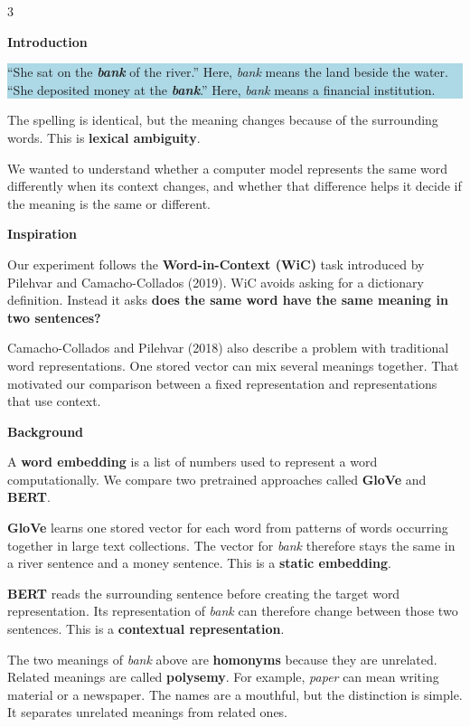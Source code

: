 \documentclass{article}
\newcommand{\sectiontitle}[1]{%
  \Needspace{4\baselineskip}%
  \par\vspace{5mm}%
  {\fontsize{30}{35}\selectfont\bfseries\textcolor{trierblue}{#1}\par}%
  \vspace{6mm}%
}
\newcommand{\keybox}[1]{%
  \colorbox{lightblue}{%
    \parbox{0.955\linewidth}{\vspace{2mm}\RaggedRight #1\vspace{2mm}}%
  }%
}
\begin{document}
\begin{multicols}{3}
\RaggedRight

\sectiontitle{Introduction}
\keybox{%
``She sat on the \textbf{\textit{bank}} of the river.'' Here, \textit{bank} means the land beside the water.\\[1.5mm]
``She deposited money at the \textbf{\textit{bank}}.'' Here, \textit{bank} means a financial institution.
}
\par\vspace{3mm}

The spelling is identical, but the meaning changes because of the surrounding words. This is \textbf{lexical ambiguity}.

We wanted to understand whether a computer model represents the same word differently when its context changes, and whether that difference helps it decide if the meaning is the same or different.

\sectiontitle{Inspiration}
Our experiment follows the \textbf{Word-in-Context (WiC)} task introduced by Pilehvar and Camacho-Collados (2019). WiC avoids asking for a dictionary definition. Instead it asks \textbf{does the same word have the same meaning in two sentences?}

Camacho-Collados and Pilehvar (2018) also describe a problem with traditional word representations. One stored vector can mix several meanings together. That motivated our comparison between a fixed representation and representations that use context.

\sectiontitle{Background}
A \textbf{word embedding} is a list of numbers used to represent a word computationally. We compare two pretrained approaches called \textbf{GloVe} and \textbf{BERT}.

\textbf{GloVe} learns one stored vector for each word from patterns of words occurring together in large text collections. The vector for \textit{bank} therefore stays the same in a river sentence and a money sentence. This is a \textbf{static embedding}.

\textbf{BERT} reads the surrounding sentence before creating the target word representation. Its representation of \textit{bank} can therefore change between those two sentences. This is a \textbf{contextual representation}.

The two meanings of \textit{bank} above are \textbf{homonyms} because they are unrelated. Related meanings are called \textbf{polysemy}. For example, \textit{paper} can mean writing material or a newspaper. The names are a mouthful, but the distinction is simple. It separates unrelated meanings from related ones.


\end{multicols}
\end{document}
